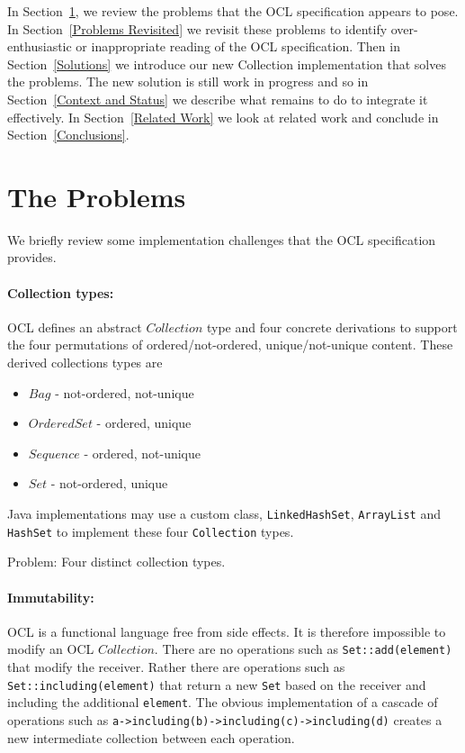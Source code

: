 \documentclass{llncs}
\begin{document}
In Section~\ref{Problems}, we review the problems that the OCL specification appears to pose. In Section~\ref{Problems Revisited} we revisit these problems to identify over-enthusiastic or inappropriate reading of the OCL specification. Then in Section~\ref{Solutions} we introduce our new Collection implementation that solves the problems. The new solution is still work in progress and so in Section~\ref{Context and Status} we describe what remains to do to integrate it effectively. In Section~\ref{Related Work} we look at related work and conclude in Section~\ref{Conclusions}.
 
\section{The Problems}\label{Problems}

We briefly review some implementation challenges that the OCL specification provides.

\paragraph{Collection types:}

OCL defines an abstract $Collection$ type and four concrete derivations to support the four permutations of ordered/not-ordered, unique/not-unique content. These derived collections types are

\begin{itemize}
	\item $Bag$ - not-ordered, not-unique
	\item $OrderedSet$ - ordered, unique
	\item $Sequence$ - ordered, not-unique
	\item $Set$ - not-ordered, unique
\end{itemize}

Java implementations may use a custom class, \verb$LinkedHashSet$, \verb$ArrayList$ and \verb$HashSet$ to implement these four \verb$Collection$ types.

Problem: Four distinct collection types.

\paragraph{Immutability:}

OCL is a functional language free from side effects. It is therefore impossible to modify an OCL $Collection$. There are no operations such as \verb$Set::add(element)$ that modify the receiver. Rather there are operations such as \verb$Set::including(element)$ that return a new \verb$Set$ based on the receiver and including the additional \verb$element$. The obvious implementation of a cascade of operations such as \verb$a->including(b)->including(c)->including(d)$ creates a new intermediate collection between each operation.
\end{document}
